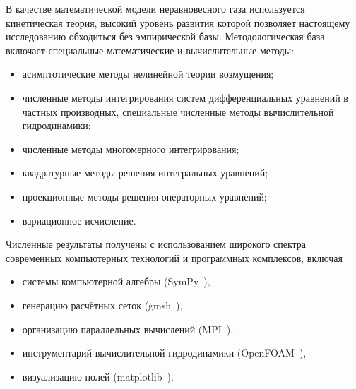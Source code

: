 {\methods}
В качестве математической модели неравновесного газа используется кинетическая теория,
высокий уровень развития которой позволяет настоящему исследованию обходиться без эмпирической базы.
Методологическая база включает специальные математические и вычислительные методы:
\begin{itemize}
    \item асимптотические методы нелинейной теории возмущения;
    \item численные методы интегрирования систем дифференциальных уравнений в частных производных,
    специальные численные методы вычислительной гидродинамики;
    \item численные методы многомерного интегрирования;
    \item квадратурные методы решения интегральных уравнений;
    \item проекционные методы решения операторных уравнений;
    \item вариационное исчисление.
\end{itemize}
Численные результаты получены с использованием широкого спектра современных компьютерных технологий и программных комплексов, включая
\begin{itemize}
    \item системы компьютерной алгебры (SymPy~\autocite{sympy}),
    \item генерацию расчётных сеток (gmsh~\autocite{gmsh}),
    \item организацию параллельных вычислений (MPI~\autocite{mpi}),
    \item инструментарий вычислительной гидродинамики (OpenFOAM~\autocite{openfoam}),
    \item визуализацию полей (matplotlib~\autocite{matplotlib}).
\end{itemize}

